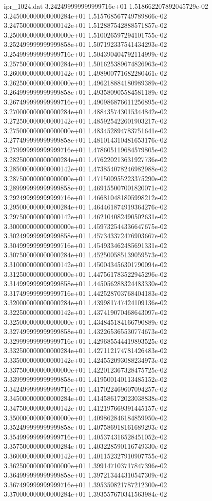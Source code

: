 \begin{filecontents}{ipr_1024.dat}
3.242499999999999716e+01 1.518662207892045729e-02
3.245000000000000284e+01 1.515768567749789866e-02
3.247500000000000142e+01 1.512887542888571857e-02
3.250000000000000000e+01 1.510026597294101755e-02
3.252499999999999858e+01 1.507192337541434293e-02
3.254999999999999716e+01 1.504390404792114999e-02
3.257500000000000284e+01 1.501625389674826963e-02
3.260000000000000142e+01 1.498900771682280461e-02
3.262500000000000000e+01 1.496218884180989389e-02
3.264999999999999858e+01 1.493580905584581189e-02
3.267499999999999716e+01 1.490986876611256895e-02
3.270000000000000284e+01 1.488435743015344842e-02
3.272500000000000142e+01 1.485925422601903217e-02
3.275000000000000000e+01 1.483452894783751641e-02
3.277499999999999858e+01 1.481014310481653176e-02
3.279999999999999716e+01 1.478605119684579805e-02
3.282500000000000284e+01 1.476220213631927736e-02
3.285000000000000142e+01 1.473854078246982988e-02
3.287500000000000000e+01 1.471500955223375290e-02
3.289999999999999858e+01 1.469155007001820071e-02
3.292499999999999716e+01 1.466810481805998212e-02
3.295000000000000284e+01 1.464461874919364276e-02
3.297500000000000142e+01 1.462104082490502631e-02
3.300000000000000000e+01 1.459732544336647675e-02
3.302499999999999858e+01 1.457343372476903667e-02
3.304999999999999716e+01 1.454933462485691331e-02
3.307500000000000284e+01 1.452500585139059573e-02
3.310000000000000142e+01 1.450043456301790094e-02
3.312500000000000000e+01 1.447561783522945296e-02
3.314999999999999858e+01 1.445056288324483330e-02
3.317499999999999716e+01 1.442528703768404183e-02
3.320000000000000284e+01 1.439981747424109136e-02
3.322500000000000142e+01 1.437419070468643097e-02
3.325000000000000000e+01 1.434845184166790889e-02
3.327499999999999858e+01 1.432265365530774673e-02
3.329999999999999716e+01 1.429685544419893525e-02
3.332500000000000284e+01 1.427112174781426483e-02
3.335000000000000142e+01 1.424552093088234973e-02
3.337500000000000000e+01 1.422012367328475725e-02
3.339999999999999858e+01 1.419500140113485152e-02
3.342499999999999716e+01 1.417022469607094257e-02
3.345000000000000284e+01 1.414586172023038838e-02
3.347500000000000142e+01 1.412197669391445157e-02
3.350000000000000000e+01 1.409862846184859950e-02
3.352499999999999858e+01 1.407586918161689293e-02
3.354999999999999716e+01 1.405374316528451052e-02
3.357500000000000284e+01 1.403228590116749330e-02
3.360000000000000142e+01 1.401152327910907755e-02
3.362500000000000000e+01 1.399147103717847396e-02
3.364999999999999858e+01 1.397213444310547309e-02
3.367499999999999716e+01 1.395350821787212300e-02
3.370000000000000284e+01 1.393557670341563984e-02

\end{filecontents}
